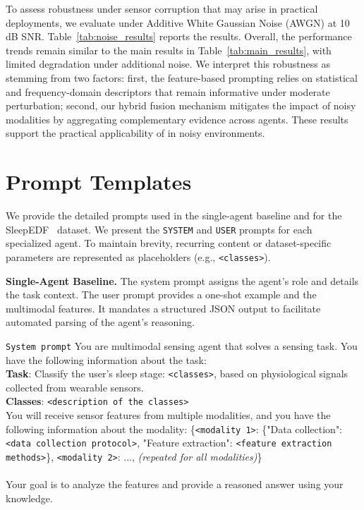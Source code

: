 To assess robustness under sensor corruption that may arise in practical deployments, we evaluate \system{} under Additive White Gaussian Noise (AWGN) at 10 dB SNR. Table~\ref{tab:noise_results} reports the results. Overall, the performance trends remain similar to the main results in Table~\ref{tab:main_results}, with limited degradation under additional noise. We interpret this robustness as stemming from two factors: first, the feature-based prompting relies on statistical and frequency-domain descriptors that remain informative under moderate perturbation; second, our hybrid fusion mechanism mitigates the impact of noisy modalities by aggregating complementary evidence across agents. These results support the practical applicability of \system{} in noisy environments.

\section{Prompt Templates}
\label{sec:appendix_prompts}

We provide the detailed prompts used in the single-agent baseline and \system{} for the SleepEDF~\citep{sleepedf} dataset. We present the \texttt{SYSTEM} and \texttt{USER} prompts for each specialized agent. To maintain brevity, recurring content or dataset-specific parameters are represented as placeholders (e.g., \texttt{<classes>}).

\noindent \textbf{Single-Agent Baseline.} The system prompt assigns the agent's role and details the task context. The user prompt provides a one-shot example and the multimodal features. It mandates a structured JSON output to facilitate automated parsing of the agent's reasoning.

\begin{promptbox}{\texttt{System prompt}}
You are multimodal sensing agent that solves a sensing task.
You have the following information about the task: \\
\textbf{Task}: Classify the user's sleep stage: \texttt{<classes>}, based on physiological signals collected from wearable sensors. \\
\textbf{Classes}: \texttt{<description of the classes>} \\
You will receive sensor features from multiple modalities, and you have the following information about the modality:
\{\texttt{<modality 1>}: \{"Data collection": \texttt{<data collection protocol>}, "Feature extraction": \texttt{<feature extraction methods>}\}, \texttt{<modality 2>}: ..., \textit{(repeated for all modalities)}\} \\ \\
Your goal is to analyze the features and provide a reasoned answer using your knowledge.
\end{promptbox}

